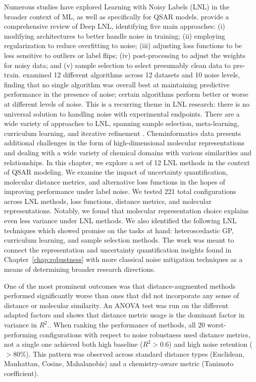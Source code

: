 Numerous studies have explored Learning with Noisy Labels (LNL) in the broader context of ML, as well as specifically for QSAR models. \citet{Song2022} provide a comprehensive review of Deep LNL, identifying five main approaches: (i) modifying architectures to better handle noise in training; (ii) employing regularization to reduce overfitting to noise; (iii) adjusting loss functions to be less sensitive to outliers or label flips; (iv) post-processing to adjust the weights for noisy data; and (v) sample selection to select presumably clean data to pre-train. \citet{Cortes2015} examined 12 different algorithms across 12 datasets and 10 noise levels, finding that no single algorithm was overall best at maintaining predictive performance in the presence of noise; certain algorithms perform better or worse at different levels of noise. This is a recurring theme in LNL research: there is no universal solution to handling noise with experimental endpoints.
There are a wide variety of approaches to LNL, spanning sample selection, meta-learning, curriculum learning, and iterative refinement \citep{Song2022}. Cheminformatics data presents additional challenges in the form of high-dimensional molecular representations and dealing with a wide variety of chemical domains with various similarities and relationships. In this chapter, we explore a set of 12 LNL methods in the context of QSAR modeling. We examine the impact of uncertainty quantification, molecular distance metrics, and alternative loss functions in the hopes of improving performance under label noise. We tested 221 total configurations across LNL methods, loss functions, distance metrics, and molecular representations. Notably, we found that molecular representation choice explains even less variance under LNL methods. We also identified the following LNL techniques which showed promise on the tasks at hand: heteroscedastic GP, curriculum learning, and sample selection methods. The work was meant to connect the representation and uncertainty quantification insights found in Chapter~\ref{chap:robustness} with more classical noise mitigation techniques as a means of determining broader research directions. 

One of the most prominent outcomes was that distance-augmented methods performed significantly worse than ones that did not incorporate any sense of distance or molecular similarity. An ANOVA test was run on the different adapted factors and shows that distance metric usage is the dominant factor in variance in $R^2$.. When ranking the performance of methods, all 20 worst-performing configurations with respect to noise robustness used distance metrics, not a single one achieved both high baseline ($R^2 > 0.6$) and high noise retention ($> 80\%$). This pattern was observed across standard distance types (Euclidean, Manhattan, Cosine, Mahalanobis) and a chemistry-aware metric (Tanimoto coefficient). 

